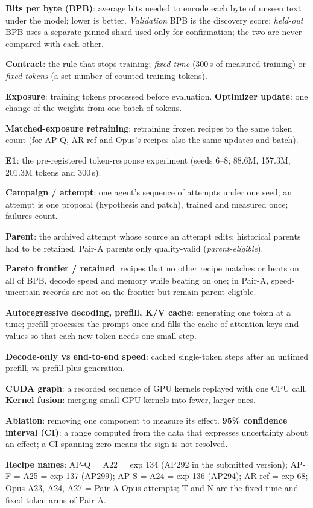 \documentclass{article}
\newif\ifshowhumanmarkers \showhumanmarkersfalse
\newcommand{\humantag}[1]{{\color{humanframe}\sffamily\scriptsize\bfseries HUMAN AUTHOR MUST REWRITE/VERIFY [#1]}\ }
\newcommand{\humanauthor}[2][]{\ifshowhumanmarkers\begin{humanbox}\humantag{#1}#2\end{humanbox}\else #2\par\fi}
\begin{document}
\humanauthor[P2-01 Glossary]{\textbf{Bits per byte (BPB)}: average bits needed to encode each byte of unseen text under the model; lower is better. \emph{Validation} BPB is the discovery score; \emph{held-out} BPB uses a separate pinned shard used only for confirmation; the two are never compared with each other.\par
\textbf{Contract}: the rule that stops training; \emph{fixed time} (300\,s of measured training) or \emph{fixed tokens} (a set number of counted training tokens).\par
\textbf{Exposure}: training tokens processed before evaluation. \textbf{Optimizer update}: one change of the weights from one batch of tokens.\par
\textbf{Matched-exposure retraining}: retraining frozen recipes to the same token count (for AP-Q, AR-ref and Opus's recipes also the same updates and batch).\par
\textbf{E1}: the pre-registered token-response experiment (seeds 6--8; 88.6M, 157.3M, 201.3M tokens and 300\,s).\par
\textbf{Campaign / attempt}: one agent's sequence of attempts under one seed; an attempt is one proposal (hypothesis and patch), trained and measured once; failures count.\par
\textbf{Parent}: the archived attempt whose source an attempt edits; historical parents had to be retained, Pair-A parents only quality-valid (\emph{parent-eligible}).\par
\textbf{Pareto frontier / retained}: recipes that no other recipe matches or beats on all of BPB, decode speed and memory while beating on one; in Pair-A, speed-uncertain records are not on the frontier but remain parent-eligible.\par
\textbf{Autoregressive decoding, prefill, K/V cache}: generating one token at a time; prefill processes the prompt once and fills the cache of attention keys and values so that each new token needs one small step.\par
\textbf{Decode-only vs end-to-end speed}: cached single-token steps after an untimed prefill, vs prefill plus generation.\par
\textbf{CUDA graph}: a recorded sequence of GPU kernels replayed with one CPU call. \textbf{Kernel fusion}: merging small GPU kernels into fewer, larger ones.\par
\textbf{Ablation}: removing one component to measure its effect. \textbf{95\% confidence interval (CI)}: a range computed from the data that expresses uncertainty about an effect; a CI spanning zero means the sign is not resolved.\par
\textbf{Recipe names}: AP-Q = A22 = exp 134 (AP292 in the submitted version); AP-F = A25 = exp 137 (AP299); AP-S = A24 = exp 136 (AP294); AR-ref = exp 68; Opus A23, A24, A27 = Pair-A Opus attempts; T and N are the fixed-time and fixed-token arms of Pair-A.}
\end{document}
